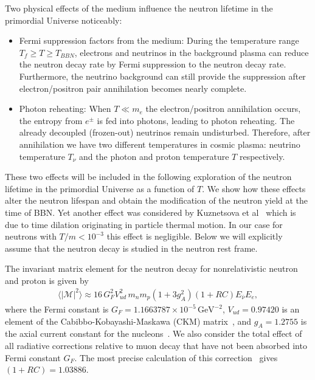 Two physical effects of the medium influence the neutron lifetime in the primordial Universe noticeably:
\begin{itemize}
\item Fermi suppression factors from the medium: 
During the temperature range $T_f\geqslant T\geqslant T_{BBN}$, electrons and neutrinos in the background plasma can reduce the neutron decay rate by Fermi suppression to the neutron decay rate. Furthermore, the neutrino background can still provide the suppression after electron/positron pair annihilation becomes nearly complete.
\item Photon reheating:
When $T\ll m_e$ the electron/positron annihilation occurs, the entropy from $e^\pm$ is fed into photons, leading to photon reheating. The already decoupled (frozen-out) neutrinos remain undisturbed. Therefore, after annihilation we have two different temperatures in cosmic plasma: neutrino temperature $T_\nu$ and the photon and proton temperature $T$ respectively.
\end{itemize}
These two effects will be included in the following exploration of the neutron lifetime in the primordial Universe as a function of $T$. We show how these effects alter the neutron lifespan and obtain the modification of the neutron yield at the time of BBN. Yet another effect was considered by Kuznetsova et al~\cite{Kuznetsova:2010pi} which is due to time dilation originating in particle thermal motion. In our case for neutrons with $T/m<10^{-3}$ this effect is negligible. Below we will explicitly assume that the neutron decay is studied in the neutron rest frame.

The invariant matrix element for the neutron decay  for nonrelativistic neutron and proton is given by
\begin{align}
\langle|\mathcal{M}|^2\rangle\approx16\,G^2_FV^2_{ud}\,m_nm_p(1+3g^2_A)(1+RC)E_{\bar{\nu}}E_e,
\end{align}
where the Fermi constant is $G_F=1.1663787\times10^{-5}\,\mathrm{GeV}^{-2}$, $V_{ud}=0.97420$ is an element of the Cabibbo-Kobayashi-Maskawa (CKM) matrix~\cite{Czarnecki:2018okw,Marciano:2005ec,Czarnecki:2004cw}, and $g_A=1.2755$ is the axial current constant for the nucleons~\cite{Czarnecki:2018okw,Marciano:2014ria}. We also consider the total effect of all radiative corrections relative to muon decay that have not been absorbed into Fermi constant $G_F$. The most precise calculation of this correction~\cite{Marciano:2014ria,Marciano:2005ec} gives $(1+RC)=1.03886$. 

